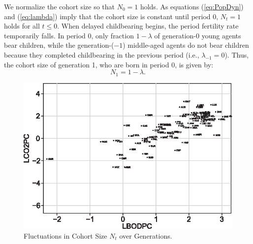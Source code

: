 \documentclass{MBE}%
\begin{document}
{We normalize the cohort size so that $N_{0}=1$ holds. As equations
(\ref{eq:PopDyn}) and (\ref{eq:lambda}) imply that the cohort size is constant
until period 0, $N_{t}=1$ holds for all $t\leq0$. When delayed childbearing
begins, the period fertility rate temporarily falls. In period 0, only
fraction $1-\lambda$ of generation-0 young agents bear children, while the
generation-($-1$) middle-aged agents do not bear children because they
completed childbearing in the previous period (i.e., $\lambda_{-1}=0$). Thus,
the cohort size of generation 1, who are born in period 0, is given by:
\begin{equation}
N_{1}=1-\lambda. \label{eq:N1}%
\end{equation}


\begin{figure}[t]
\begin{center}
\includegraphics[height=0.21\textheight]{flrf1.eps}
\end{center}
\caption{Fluctuations in Cohort Size $N_{t}$ over Generations.}%
\label{fig:popdynamics}%
\end{figure}


}
\end{document}
